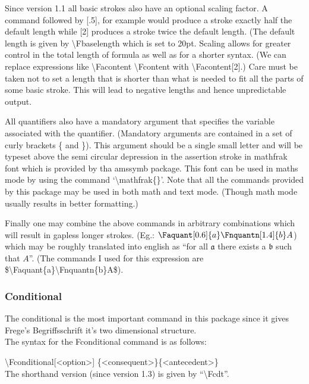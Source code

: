 \documentclass[12pt]{article}
\begin{document}
  Since version 1.1 all basic strokes also have an optional scaling factor. A command 
  followed by [.5], for example would produce a stroke exactly half the default 
  length while [2] produces a stroke twice the default length. (The default length 
  is given by \textbackslash Fbaselength which is set to 20pt. Scaling allows for 
  greater control in the total length of formula as well as for a shorter syntax. 
  (We can replace expressions like \textbackslash Facontent \textbackslash Fcontent 
  with \textbackslash Facontent[2].) Care must be taken not to set a length that is 
  shorter than what is needed to fit all the parts of some basic stroke. This will 
  lead to negative lengths and hence unpredictable output.

  All quantifiers also have a mandatory argument that specifies the variable 
  associated with the quantifier. (Mandatory arguments are contained in a set of 
  curly brackets \{ and \}). This argument should be a single small letter and 
  will be typeset above the semi circular depression in the assertion stroke in 
  mathfrak font which is provided by tha amssymb package. This font can be used in 
  maths mode by using the command `\textbackslash mathfrak\{\}'. Note that all the 
  commands provided by this package may be used in both math and text mode. (Though 
  math mode usually results in better formatting.)

  Finally one may combine the above commands in arbitrary combinations which will 
  result in gapless longer strokes. (Eg.: $\Faquant[0.6]{a}\Fnquantn[1.4]{b}A$) 
  which may be roughly translated into english as ``for all $\mathfrak{a}$ there 
  exists a $\mathfrak{b}$ such that $A$''. (The commands I used for this expression 
  are \$\textbackslash Faquant\{a\}\textbackslash Fnquantn\{b\}A\$).

\subsubsection{Conditional}
  The conditional is the most important command in this package since it gives 
  Frege's Begriffsschrift it's two dimensional structure.\\
  The syntax for the Fconditional command is as follows:
  
  \textbackslash Fconditional[\textless option\textgreater]
  \{\textless consequent\textgreater\}\{\textless antecedent\textgreater\}\\
  The shorthand version (since version 1.3) is given by ``\textbackslash Fcdt''.
\end{document}
